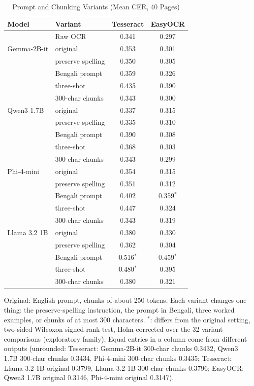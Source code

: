 \begin{table}[t]
\centering
\caption{Prompt and Chunking Variants (Mean CER, 40 Pages)}
\label{tab:variants}
\setlength{\tabcolsep}{4pt}
\footnotesize
\begin{tabular}{llcc}
\toprule
Model & Variant & Tesseract & EasyOCR \\
\midrule
 & Raw OCR & 0.341 & 0.297 \\
\midrule
Gemma-2B-it & original & 0.353 & 0.301 \\
 & preserve spelling & 0.350 & 0.305 \\
 & Bengali prompt & 0.359 & 0.326 \\
 & three-shot & 0.435 & 0.390 \\
 & 300-char chunks & 0.343 & 0.300 \\
\midrule
Qwen3 1.7B & original & 0.337 & 0.315 \\
 & preserve spelling & 0.335 & 0.310 \\
 & Bengali prompt & 0.390 & 0.308 \\
 & three-shot & 0.368 & 0.303 \\
 & 300-char chunks & 0.343 & 0.299 \\
\midrule
Phi-4-mini & original & 0.354 & 0.315 \\
 & preserve spelling & 0.351 & 0.312 \\
 & Bengali prompt & 0.402 & 0.359$^{*}$ \\
 & three-shot & 0.447 & 0.324 \\
 & 300-char chunks & 0.343 & 0.319 \\
\midrule
Llama 3.2 1B & original & 0.380 & 0.330 \\
 & preserve spelling & 0.362 & 0.304 \\
 & Bengali prompt & 0.516$^{*}$ & 0.459$^{*}$ \\
 & three-shot & 0.480$^{*}$ & 0.395 \\
 & 300-char chunks & 0.380 & 0.321 \\
\bottomrule
\end{tabular}
\par\smallskip
\begin{minipage}{\linewidth}\footnotesize Original: English prompt, chunks of about 250 tokens. Each variant changes one thing: the preserve-spelling instruction, the prompt in Bengali, three worked examples, or chunks of at most 300 characters. $^{*}$: differs from the original setting, two-sided Wilcoxon signed-rank test, Holm-corrected over the 32 variant comparisons (exploratory family). Equal entries in a column come from different outputs (unrounded: Tesseract: Gemma-2B-it 300-char chunks 0.3432, Qwen3 1.7B 300-char chunks 0.3434, Phi-4-mini 300-char chunks 0.3435; Tesseract: Llama 3.2 1B original 0.3799, Llama 3.2 1B 300-char chunks 0.3796; EasyOCR: Qwen3 1.7B original 0.3146, Phi-4-mini original 0.3147).\end{minipage}
\end{table}

